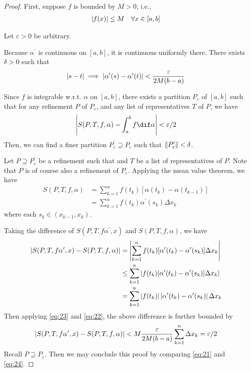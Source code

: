\documentclass[thmcnt=section, color=blue, 12pt]{my-elegantbook}
\begin{document}
\begin{proof}
	First, suppose $f$ is bounded by $M > 0$, i.e.,
	\begin{align}
		\left\lvert f(x) \right\rvert \leq M \quad \forall x \in [a, b]
		\label{eq:23}
	\end{align}

	Let $\varepsilon > 0$ be arbitrary.


	Because $\alpha^\prime$ is continuous on $[a, b]$,
	it is continuous uniformly there.
	There exists $\delta > 0$ such that
	\begin{align}
		\left\lvert s - t \right\rvert \implies \left\lvert \alpha^\prime(s) - \alpha^\prime(t) \right\rvert
		< \frac{\varepsilon}{2M(b-a)}
		\label{eq:22}
	\end{align}

	Since $f$ is integrable w.r.t. $\alpha$ on $[a, b]$,
	there exists a partition $P_\varepsilon$ of $[a, b]$
	such that
	for any refinement $P$ of $P_\varepsilon$,
	and any list of representatives $T$ of $P$,
	we have
	\begin{align}
		\abs{ S(P, T, f, \alpha) - \int_a^b f \dif \alpha}
		< \varepsilon / 2
		\label{eq:21}
	\end{align}
	Then, we can find a finer
	partition $P^\prime_\varepsilon \supseteq P_\varepsilon$
	such that $\left\lVert P^\prime_\varepsilon \right\rVert < \delta$.


	Let $P \supseteq P^\prime_\varepsilon$ be a refinement
	such that
	and $T$ be a list of representatives of $P$.
	Note that $P$ is of course also a refinement of $P_\varepsilon$.
	Applying the mean value theorem, we have
	\begin{align*}
		S(P,T,f,\alpha)
		 & = \sum_{k=1}^n f(t_k) [ \alpha(t_k) - \alpha(t_{k-1}) ] \nonumber \\
		 & = \sum_{k=1}^n f(t_k) \alpha^\prime(s_k) \Delta x_k
	\end{align*}
	where each $s_k \in (x_{k-1}, x_k)$.

	Taking the difference of $S(P,T,f \alpha^\prime, x)$
	and $S(P,T,f,\alpha)$, we have
	\begin{align*}
		\left\lvert S(P,T,f \alpha^\prime, x) - S(P,T,f,\alpha) \right\rvert
		 & = \left\lvert \sum_{k=1}^n f(t_k)
		[\alpha^\prime(t_k) - \alpha^\prime(s_k)] \Delta x_k \right\rvert \\
		 & \leq \sum_{k=1}^n \left\lvert 
			f(t_k)
			[\alpha^\prime(t_k) - \alpha^\prime(s_k)] \Delta x_k
		 \right\rvert                                                     \\
		 & = \sum_{k=1}^n \left\lvert 
			f(t_k) \right\rvert
		\left\lvert  \alpha^\prime(t_k) - \alpha^\prime(s_k)  \right\rvert \Delta x_k
	\end{align*}
	Then applying \eqref{eq:23} and \eqref{eq:22},
	the above difference is further bounded by
	\begin{align}
		\left\lvert S(P,T,f \alpha^\prime, x) - S(P,T,f,\alpha) \right\rvert
		< M \frac{\varepsilon}{2M(b-a)} \sum_{k=1}^n \Delta x_k
		= \varepsilon / 2
		\label{eq:24}
	\end{align}
	Recall $P \supseteq P_\varepsilon$.
	Then we may conclude this proof
	by comparing \eqref{eq:21} and \eqref{eq:24}.
\end{proof}
\end{document}
